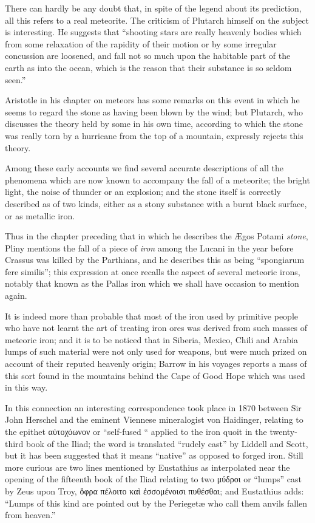 \documentclass[a4paper, 12pt, oneside]{article}
\begin{document}
There can hardly be any doubt that, in spite of the legend about its prediction, all this refers to a real meteorite. The criticism of Plutarch himself on the subject is interesting. He suggests that ``shooting stars are really heavenly bodies which from some relaxation of the rapidity of their motion or by some irregular concussion are loosened, and fall not so much upon the habitable part of the earth as into the ocean, which is the reason that their substance is so seldom seen.'' 

Aristotle in his chapter on meteors has some remarks on this event in which he seems to regard the stone as having been blown by the wind; but Plutarch, who discusses the theory held by some in his own time, according to which the stone was really torn by a hurricane from the top of a mountain, expressly rejects this theory. 

Among these early accounts we find several accurate descriptions of all the phenomena which are now known to accompany the fall of a meteorite; the bright light, the noise of thunder or an explosion; and the stone itself is correctly described as of two kinds, either as a stony substance with a burnt black surface, or as metallic iron. 

Thus in the chapter preceding that in which he describes the Ægos Potami \emph{stone}, Pliny mentions the fall of a piece of \emph{iron} among the Lucani in the year before Crassus was killed by the Parthians, and he describes this as being ``spongiarum fere similis''; this expression at once recalls the aspect of several meteoric irons, notably that known as the Pallas iron which we shall have occasion to mention again. 

It is indeed more than probable that most of the iron used by primitive people who have not learnt the art of treating iron ores was derived from such masses of meteoric iron; and it is to be noticed that in Siberia, Mexico, Chili and Arabia lumps of such material were not only used for weapons, but were much prized on account of their reputed heavenly origin; Barrow in his voyages reports a mass of this sort found in the mountains behind the Cape of Good Hope which was used in this way. 

In this connection an interesting correspondence took place in 1870 between Sir John Herschel and the eminent Viennese mineralogist von Haidinger, relating to the epithet αὐτοχόωνον or ``self-fused `` applied to the iron quoit in the twenty-third book of the Iliad; the word is translated ``rudely cast'' by Liddell and Scott, but it has been suggested that it means ``native'' as opposed to forged iron. Still more curious are two lines mentioned by Eustathius as interpolated near the opening of the fifteenth book of the Iliad relating to two μύδροι or ``lumps'' cast by Zeus upon Troy, ὄφρα πέλοιτο καὶ ἐσσομένοισι πυθέσθαι; and Eustathius adds: ``Lumps of this kind are pointed out by the Periegetæ who call them anvils fallen from heaven.''
\end{document}
